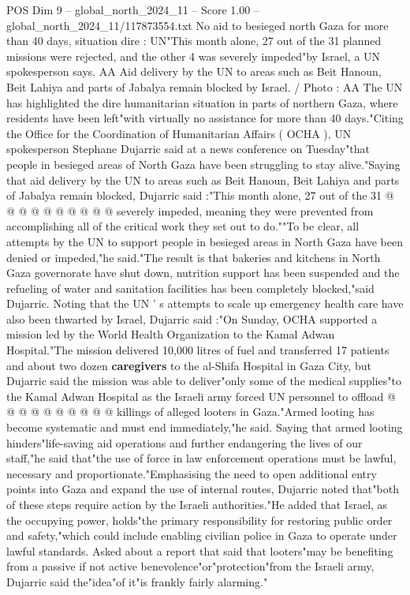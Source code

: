 \begin{textsample}{POS Dim 9 – global\_north\_2024\_11 – Score 1.00 – global\_north\_2024\_11/117873554.txt}  \label{ex:f9_pos_406}
No aid to besieged north Gaza for more than 40 days, situation dire : UN"This month alone, 27 out of the 31 planned missions were rejected, and the other 4 was severely impeded"by Israel, a UN spokesperson says.
AA Aid delivery by the UN to areas such as Beit Hanoun, Beit Lahiya and parts of Jabalya remain blocked by Israel. / Photo : AA The UN has highlighted the dire humanitarian situation in parts of northern Gaza, where residents have been left"with virtually no assistance for more than 40 days."Citing the Office for the Coordination of Humanitarian Affairs ( OCHA ), UN spokesperson Stephane Dujarric said at a news conference on Tuesday"that people in besieged areas of North Gaza have been struggling to stay alive."Saying that aid delivery by the UN to areas such as Beit Hanoun, Beit Lahiya and parts of Jabalya remain blocked, Dujarric said :"This month alone, 27 out of the 31 @ @ @ @ @ @ @ @ @ @ severely impeded, meaning they were prevented from accomplishing all of the critical work they set out to do.""To be clear, all attempts by the UN to support people in besieged areas in North Gaza have been denied or impeded,"he said."The result is that bakeries and kitchens in North Gaza governorate have shut down, nutrition support has been suspended and the refueling of water and sanitation facilities has been completely blocked,"said Dujarric.
Noting that the UN ' s attempts to scale up emergency health care have also been thwarted by Israel, Dujarric said :"On Sunday, OCHA supported a mission led by the World Health Organization to the Kamal Adwan Hospital."The mission delivered 10,000 litres of fuel and transferred 17 patients and about two dozen \textbf{caregivers} to the al-Shifa Hospital in Gaza City, but Dujarric said the mission was able to deliver"only some of the medical supplies"to the Kamal Adwan Hospital as the Israeli army forced UN personnel to offload @ @ @ @ @ @ @ @ @ @ killings of alleged looters in Gaza."Armed looting has become systematic and must end immediately,"he said.
Saying that armed looting hinders"life-saving aid operations and further endangering the lives of our staff,"he said that"the use of force in law enforcement operations must be lawful, necessary and proportionate."Emphasising the need to open additional entry points into Gaza and expand the use of internal routes, Dujarric noted that"both of these steps require action by the Israeli authorities."He added that Israel, as the occupying power, holds"the primary responsibility for restoring public order and safety,"which could include enabling civilian police in Gaza to operate under lawful standards.
Asked about a report that said that looters"may be benefiting from a passive if not active benevolence"or"protection"from the Israeli army, Dujarric said the"idea"of it"is frankly fairly alarming."

\end{textsample}
